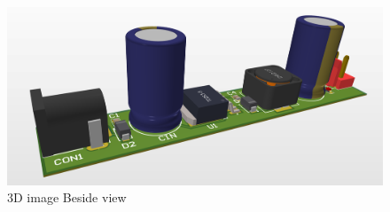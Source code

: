 \begin{figure}[ht]
    \centering
    \includegraphics[scale=0.26]{graphics/ex2/f7.png}
    \caption{3D image Beside view}
\end{figure}
